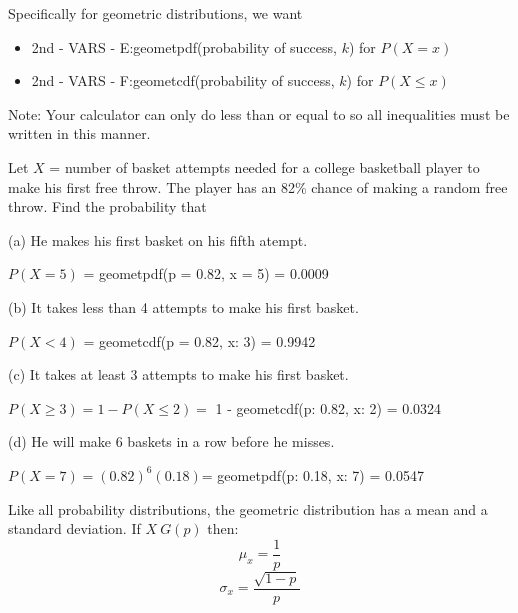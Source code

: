 \documentclass[../stats.tex]{subfiles}
\begin{document}
Specifically for geometric distributions, we want 
\begin{itemize}
    \item 2nd - VARS - E:geometpdf(probability of success, $k$) for $P(X=x)$
    \item 2nd - VARS - F:geometcdf(probability of success, $k$) for $P(X\leq x)$
\end{itemize}

Note: Your calculator can only do less than or equal to so all inequalities must be written in this manner.

\begin{example}
    Let $X$ = number of basket attempts needed for a college basketball player to make his first free throw. The player has an 82\% chance of making a random free throw. Find the probability that 

    (a) He makes his first basket on his fifth atempt.

    $P(X=5)$ = geometpdf(p = 0.82, x = 5) = 0.0009

    (b) It takes less than 4 attempts to make his first basket.

    $P(X<4)$ = geometcdf(p = 0.82, x: 3) = 0.9942

    (c) It takes at least 3 attempts to make his first basket.

    $P(X\geq 3) = 1-P(X\leq 2) =$ 1 - geometcdf(p: 0.82, x: 2) = 0.0324

    (d) He will make 6 baskets in a row before he misses.

    $P(X=7)=(0.82)^6(0.18)$= geometpdf(p: 0.18, x: 7) = 0.0547
\end{example}

Like all probability distributions, the geometric distribution has a mean and a standard deviation. If $X~G(p)$ then: 
\[ \mu_x = \frac{1}{p}\]
\[ \sigma_x = \frac{\sqrt{1-p}}{p} \]
\end{document}
